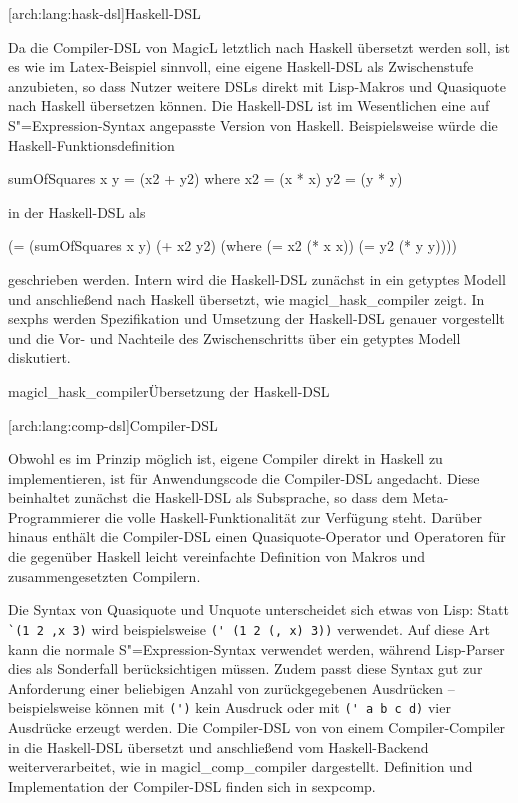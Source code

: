 \documentclass[12pt, a4paper, bibgerm]{scrbook}
\newenvironment{DIFnomarkup}{}{}
\newcommand\icode[1]{\lstinline?#1?}
\newcommand\lsubsection{}
\newcommand\cref{}
\newcommand\abb{}
\newcommand\fig{}
\newcommand{\sexp}{S"=Expression}
\begin{document}
\lsubsection[arch:lang:hask-dsl]{Haskell-DSL}

Da die Compiler-DSL von MagicL letztlich nach Haskell übersetzt werden
soll, ist es wie im Latex-Beispiel sinnvoll, eine eigene Haskell-DSL als
Zwischenstufe anzubieten, so dass Nutzer weitere DSLs direkt mit
Lisp-Makros und Quasiquote nach Haskell übersetzen können. Die
Haskell-DSL ist im Wesentlichen eine auf \sexp{}-Syntax angepasste
Version von Haskell. Beispielsweise würde die
Haskell-Funktionsdefinition
\begin{DIFnomarkup}
\begin{code}
sumOfSquares x y = (x2 + y2)
  where
    x2 = (x * x)            
    y2 = (y * y)
\end{code}
\end{DIFnomarkup}
in der Haskell-DSL als
\begin{DIFnomarkup}
\begin{code}
(= (sumOfSquares x y)
   (+ x2 y2)
  (where
    (= x2 (* x x))
    (= y2 (* y y))))
\end{code}
\end{DIFnomarkup}
geschrieben werden. Intern wird die Haskell-DSL zunächst in ein getyptes
Modell und anschließend nach Haskell übersetzt, wie
\abb{magicl_hask_compiler} zeigt. In \cref{sexphs} werden Spezifikation und Umsetzung
der Haskell-DSL genauer vorgestellt und die Vor- und Nachteile des
Zwischenschritts über ein getyptes Modell diskutiert.

\fig{magicl_hask_compiler}{Übersetzung der Haskell-DSL}

\lsubsection[arch:lang:comp-dsl]{Compiler-DSL}

Obwohl es im Prinzip möglich ist, eigene Compiler direkt in Haskell zu
implementieren, ist für Anwendungscode die Compiler-DSL angedacht. Diese
beinhaltet zunächst die Haskell-DSL als Subsprache, so dass dem
Meta-Programmierer die volle Haskell-Funktionalität zur Verfügung steht.
Darüber hinaus enthält die Compiler-DSL einen Quasiquote-Operator und
Operatoren für die gegenüber Haskell leicht vereinfachte Definition von
Makros und zusammengesetzten Compilern.

Die Syntax von Quasiquote und Unquote unterscheidet sich etwas von Lisp:
Statt \icode{`(1 2 ,x 3)} wird beispielsweise \icode{(' (1 2 (, x) 3))}
verwendet. Auf diese Art kann die normale \sexp{}-Syntax verwendet
werden, während Lisp-Parser dies als Sonderfall berücksichtigen
müssen. Zudem passt diese Syntax gut zur Anforderung einer beliebigen
Anzahl von zurückgegebenen Ausdrücken -- beispielsweise können mit
\icode{(')} kein Ausdruck oder mit \icode{(' a b c d)} vier Ausdrücke
erzeugt werden. Die Compiler-DSL von von einem Compiler-Compiler in die
Haskell-DSL übersetzt und anschließend vom Haskell-Backend
weiterverarbeitet, wie in \abb{magicl_comp_compiler}
dargestellt. Definition und Implementation der Compiler-DSL finden sich
in \cref{sexpcomp}.
\end{document}
